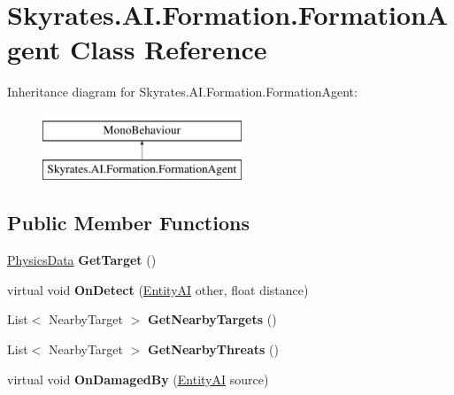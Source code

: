 \hypertarget{class_skyrates_1_1_a_i_1_1_formation_1_1_formation_agent}{\section{Skyrates.\-A\-I.\-Formation.\-Formation\-Agent Class Reference}
\label{class_skyrates_1_1_a_i_1_1_formation_1_1_formation_agent}
}
Inheritance diagram for Skyrates.\-A\-I.\-Formation.\-Formation\-Agent\-:\begin{figure}[H]
\begin{center}
\leavevmode
\includegraphics[height=2.000000cm]{class_skyrates_1_1_a_i_1_1_formation_1_1_formation_agent}
\end{center}
\end{figure}
\subsection*{Public Member Functions}
\begin{DoxyCompactItemize}
\item 
\hypertarget{class_skyrates_1_1_a_i_1_1_formation_1_1_formation_agent_ac381a49f6fa4b61d08c1d02a052749c7}{\hyperlink{class_skyrates_1_1_physics_1_1_physics_data}{Physics\-Data} {\bfseries Get\-Target} ()}\label{class_skyrates_1_1_a_i_1_1_formation_1_1_formation_agent_ac381a49f6fa4b61d08c1d02a052749c7}

\item 
\hypertarget{class_skyrates_1_1_a_i_1_1_formation_1_1_formation_agent_a8334e3a7e66beacfb5d46d18971f9602}{virtual void {\bfseries On\-Detect} (\hyperlink{class_skyrates_1_1_entity_1_1_entity_a_i}{Entity\-A\-I} other, float distance)}\label{class_skyrates_1_1_a_i_1_1_formation_1_1_formation_agent_a8334e3a7e66beacfb5d46d18971f9602}

\item 
\hypertarget{class_skyrates_1_1_a_i_1_1_formation_1_1_formation_agent_afcfcdaf51a89faba1504f3aa2ee2bc87}{List$<$ Nearby\-Target $>$ {\bfseries Get\-Nearby\-Targets} ()}\label{class_skyrates_1_1_a_i_1_1_formation_1_1_formation_agent_afcfcdaf51a89faba1504f3aa2ee2bc87}

\item 
\hypertarget{class_skyrates_1_1_a_i_1_1_formation_1_1_formation_agent_abfab49ea4b4684e2152346ea6f6f0ad3}{List$<$ Nearby\-Target $>$ {\bfseries Get\-Nearby\-Threats} ()}\label{class_skyrates_1_1_a_i_1_1_formation_1_1_formation_agent_abfab49ea4b4684e2152346ea6f6f0ad3}

\item 
\hypertarget{class_skyrates_1_1_a_i_1_1_formation_1_1_formation_agent_a73efdc27b3a59a12ee2331edb36d6463}{virtual void {\bfseries On\-Damaged\-By} (\hyperlink{class_skyrates_1_1_entity_1_1_entity_a_i}{Entity\-A\-I} source)}\label{class_skyrates_1_1_a_i_1_1_formation_1_1_formation_agent_a73efdc27b3a59a12ee2331edb36d6463}

\end{DoxyCompactItemize}
